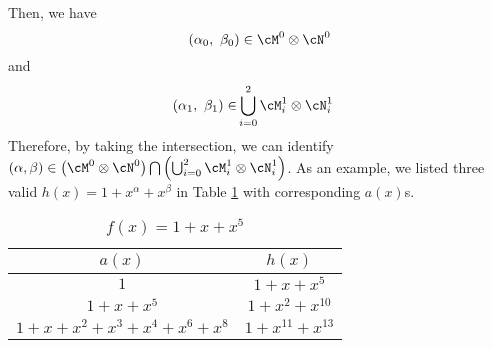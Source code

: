 \begin{example}
Then, we have
\[
(\alpha_0,~\beta_0) \in \cM^0\otimes\cN^0 
\]
and
\begin{equation*}
\begin{split}
(\alpha_1,~\beta_1) \in &\bigcup_{i=0}^2 \cM_i^1\otimes\cN_i^1 
\end{split}
\end{equation*}
Therefore, by taking the intersection, we can identify $(\alpha,\beta) \in \left(\cM^0\otimes\cN^0\right)\bigcap\left(\bigcup_{i=0}^2 \cM_i^1\otimes\cN_i^1 \right) $. As an example, we listed three valid $h(x)=1+x^\alpha+x^\beta$ in Table \ref{novelTab8-b} with corresponding $a(x)$s.
\begin{table}[htbp]
 \caption{$f(x)=1+x+x^5$}
\centering
 \begin{tabular}{c c} 
 \toprule
 $a(x)$ & $h(x)$\\ [0.5ex] 
 \midrule
$1$ & $1+x+x^{5}$\\ 
\hline
$1+x+x^5$ &  $1+x^2+x^{10}$\\
\hline
$1+x+x^2+x^3+x^4+x^{6}+x^{8}$ & $1+x^{11}+x^{13}$\\
\bottomrule
 \end{tabular}
 \label{novelTab8-b}
\end{table}

\label{ex-5}
\end{example}
 







